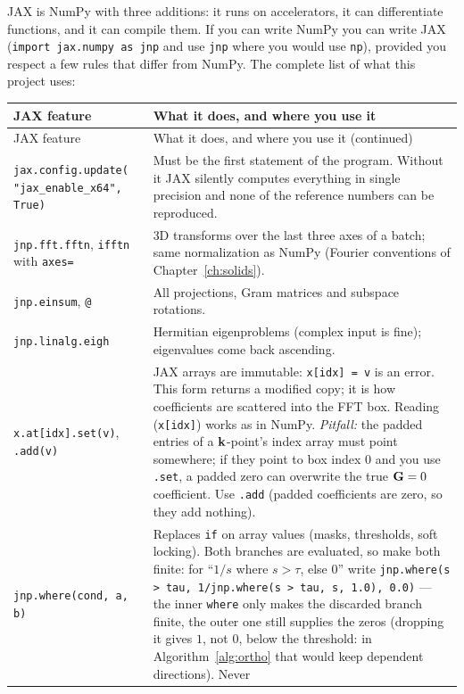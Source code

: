 JAX is NumPy with three additions: it runs on accelerators, it can
differentiate functions, and it can compile them. If you can write NumPy
you can write JAX (\texttt{import jax.numpy as jnp} and use \texttt{jnp}
where you would use \texttt{np}), provided you respect a few rules that
differ from NumPy. The complete list of what this project uses:
{\small
\begin{longtable}{@{}>{\raggedright\arraybackslash}p{}p{}@{}}
\toprule
JAX feature & What it does, and where you use it\\
\midrule
\endfirsthead
\toprule
JAX feature & What it does, and where you use it (continued)\\
\midrule
\endhead
\bottomrule
\endlastfoot
\texttt{jax.config.update(} \texttt{"jax\_enable\_x64", True)} & Must be the first
statement of the program. Without it JAX silently computes everything in
single precision and none of the reference numbers can be reproduced.\\
\texttt{jnp.fft.fftn}, \texttt{ifftn} with \texttt{axes=} & 3D
transforms over the last three axes of a batch; same normalization as
NumPy (Fourier conventions of Chapter~\ref{ch:solids}).\\
\texttt{jnp.einsum}, \texttt{@} & All projections, Gram matrices and
subspace rotations.\\
\texttt{jnp.linalg.eigh} & Hermitian eigenproblems (complex input is
fine); eigenvalues come back ascending.\\
\texttt{x.at[idx].set(v)}, \texttt{.add(v)} & JAX arrays are immutable:
\texttt{x[idx] = v} is an error. This form returns a modified copy; it
is how coefficients are scattered into the FFT box. Reading
(\texttt{x[idx]}) works as in NumPy. \emph{Pitfall:} the padded entries
of a $\mathbf{k}$-point's index array must point somewhere; if they point to box
index 0 and you use \texttt{.set}, a padded zero can overwrite the true
$\mathbf{G} = 0$ coefficient. Use \texttt{.add} (padded coefficients are zero, so
they add nothing).\\
\texttt{jnp.where(cond, a, b)} & Replaces \texttt{if} on array values
(masks, thresholds, soft locking). Both branches are evaluated, so make
both finite: for ``$1/s$ where $s > \tau$, else $0$'' write
\texttt{jnp.where(s > tau, 1/jnp.where(s > tau, s, 1.0), 0.0)} --- the inner
\texttt{where} only makes the discarded branch finite, the outer one still
supplies the zeros (dropping it gives $1$, not $0$, below the threshold:
in Algorithm~\ref{alg:ortho} that would keep dependent directions). Never

\end{longtable}}

